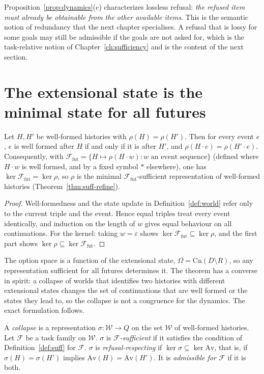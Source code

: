 Proposition~\ref{prop:dynamics}(c) characterizes lossless refusal: \emph{the refused item must already be obtainable from the other available items}. This is the semantic notion of redundancy that the next chapter specialises. A refusal that is lossy for some goals may still be admissible if the goals are not asked for, which is the task-relative notion of Chapter~\ref{ch:sufficiency} and is the content of the next section.

\section{The extensional state is the minimal state for all futures}

\begin{theorem}
\label{thm:future}
Let $H,H'$ be well-formed histories with $\rho(H)=\rho(H')$. Then for every event $e$, $e$ is well formed after $H$ if and only if it is after $H'$, and $\rho(H\cdot e)=\rho(H'\cdot e)$. Consequently, with $\mathcal F_{\mathrm{fut}}=\{H\mapsto\rho(H\cdot w):w\text{ an event sequence}\}$ (defined where $H\cdot w$ is well formed, and by a fixed symbol $\ast$ elsewhere), one has $\ker\mathcal F_{\mathrm{fut}}=\ker\rho$, so $\rho$ is the minimal $\mathcal F_{\mathrm{fut}}$-sufficient representation of well-formed histories (Theorem~\ref{thm:suff-refine}).
\end{theorem}

\begin{proof}
Well-formedness and the state update in Definition~\ref{def:world} refer only to the current triple and the event. Hence equal triples treat every event identically, and induction on the length of $w$ gives equal behaviour on all continuations. For the kernel: taking $w=\varepsilon$ shows $\ker\mathcal F_{\mathrm{fut}}\subseteq\ker\rho$, and the first part shows $\ker\rho\subseteq\ker\mathcal F_{\mathrm{fut}}$.
\end{proof}

The option space is a function of the extensional state, $\Omega=\mathrm{Cn}(D\setminus R)$, so any representation sufficient for all futures determines it. The theorem has a converse in spirit: a collapse of worlds that identifies two histories with different extensional states changes the set of continuations that are well formed or the states they lead to, so the collapse is not a congruence for the dynamics. The exact formulation follows.

\begin{definition}
\label{def:collapse}
A \emph{collapse} is a representation $\sigma:\mathcal W\to Q$ on the set $\mathcal W$ of well-formed histories. Let $\mathcal F$ be a task family on $\mathcal W$. $\sigma$ is \emph{$\mathcal F$-sufficient} if it satisfies the condition of Definition~\ref{def:suff} for $\mathcal F$. $\sigma$ is \emph{refusal-respecting} if $\ker\sigma\subseteq\ker\mathrm{Av}$, that is, if $\sigma(H)=\sigma(H')$ implies $\mathrm{Av}(H)=\mathrm{Av}(H')$. It is \emph{admissible for $\mathcal F$} if it is both.
\end{definition}

